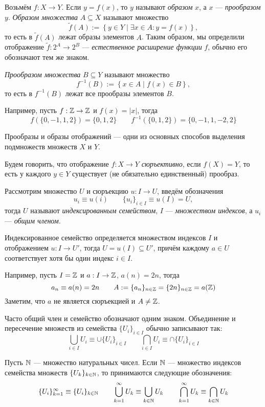 Возьмём $f:X\to Y$. Если $y=f(x)$, то $y$ называют {\it образом} $x$,
а $x$ --- {\it прообразом} $y$. {\it Образом множества} $A\subseteq X$
называют множество
\[
	\widetilde f(A):=\left\{y\in Y\;\big|\; \exists x\in A:y=f(x)\right\},
\]
то есть в $\widetilde f(A)$ лежат образы элементов $A$. Таким образом, мы определили
отображение $\widetilde f:2^{A}\to 2^{B}$ ---
{\it естественное расширение функции} $f$, обычно его обозначают
тем же знаком.

{\it Прообразом множества} $B\subseteq Y$ называют множество
\[
	f^{-1}(B):=\left\{x\in A\;\big|\; f(x)\in B\right\},
\]
то есть в $f^{-1}(B)$ лежат все прообразы элементов $B$.

Например, пусть $f:\mathbb Z\to\mathbb Z$ и $f(x)=|x|$, тогда
\[
	f(\{0,-1,1,2\})=\{0,1,2\}\qquad f^{-1}(\{0,1,2\})=\{0,-1,1,-2,2\}
\]

Прообразы и образы отображений --- одни из основных способов выделения
подмножеств множеств $X$ и $Y$.

Будем говорить, что отображение $f:X\to Y$ {\it сюръективно}, если $f(X)=Y$,
то есть у каждого $y\in Y$ существует (не обязательно единственный) прообраз.

Рассмотрим множество $U$ и сюръекцию ${u:I\to U}$,
введём обозначения
\[
	u_{i}\equiv u(i)\qquad \{u_{i}\}_{i\in I}\equiv u(I)=U,
\]
тогда $U$ называют {\it индексированным семейством}, $I$ --- {\it множеством индексов},
а $u_{i}$ --- {\it общим членом}.

Индексированное семейство определяется множеством индексов $I$ и отображением
${u:I\to U'}$, тогда $U=u(I)\subseteq U'$,
причём каждому $a\in U$ соответствует хотя бы один индекс $i\in I$.

Например, пусть $I=\mathbb Z$ и $a:I\to \mathbb Z$, $a(n)=2n$, тогда
\[
	a_{n}\equiv a(n)=2n\qquad A:=\{a_{n}\}_{n\in\mathbb Z}=\{2n\}_{n\in\mathbb Z}=a(\mathbb Z)
\]
Заметим, что $a$ не является сюръекцией и $A\neq \mathbb Z$.

Часто общий член и семейство обозначают одним знаком.
Объединение и пересечение множеств из семейства $\{U_{i}\}_{i\in I}$
обычно записывают так:
\[
	\bigcup_{i\in I}U_{i}\equiv\cup \{U_{i}\}_{i\in I}\qquad
	\bigcap_{i\in I}U_{i}\equiv\cap \{U_{i}\}_{i\in I}
\]

Пусть $\mathbb N$ --- множество натуральных чисел. Если $\mathbb N$ --- множество индексов
семейства множеств $\{U_{k}\}_{k\in\mathbb N}$, то принимаются следующие обозначения:
\[
	\{U_{i}\}_{k=1}^{\infty}\equiv\{U_{i}\}_{k\in\mathbb N}\qquad
	\bigcup_{k=1}^{\infty}U_{k}\equiv\bigcup_{k\in\mathbb N}U_{k}\qquad
	\bigcap_{k=1}^{\infty}U_{k}\equiv\bigcap_{k\in\mathbb N}U_{k}
\]


